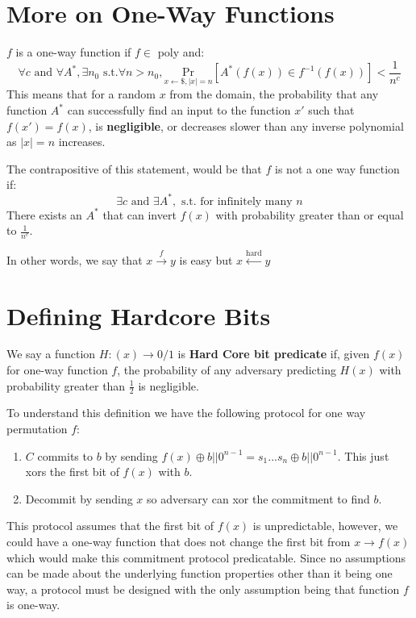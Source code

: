 \documentclass[11pt]{article}
\begin{document}
\section{More on One-Way Functions}
$f$ is a one-way function if $f \in$ poly and:
$$\forall c \text{ and } \forall A^*, \exists n_0 \text{ s.t.} \forall n > n_0, \underset{x \leftarrow \$, |x| = n}{\text{Pr}}[A^*(f(x)) \in f^{-1}(f(x))] < \frac{1}{n^c}$$
This means that for a random $x$ from the domain, the probability that any function $A^{*}$ can successfully find an input to the function $x'$ such that $f(x') = f(x)$, is \textbf{negligible}, or decreases slower than any inverse polynomial as $|x| = n$ increases.
\vspace{1em}

The contrapositive of this statement, would be that $f$ is not a one way function if:
$$\exists c \text{ and } \exists A^*, \text{ s.t. for infinitely many } n$$
There exists an $A^*$ that can invert $f(x)$ with probability greater than or equal to $\frac{1}{n^c}$.
\vspace{1em}

In other words, we say that $x \overset{f}{\rightarrow} y$ is easy but $x \overset{\text{hard}}{\longleftarrow} y$

\section{Defining Hardcore Bits}
We say a function $H: (x) \rightarrow 0/1 $ is \textbf{Hard Core bit predicate} if, given $f(x)$ for one-way function $f$, the probability of any adversary predicting $H(x)$ with probability greater than $\frac{1}{2}$ is negligible.
\vspace{1em}

To understand this definition we have the following protocol for one way permutation $f$:
\begin{enumerate}
    \item $C$ commits to $b$ by sending $f(x) \oplus b || 0^{n-1} = s_1...s_n \oplus b || 0^{n-1}$. This just xors the first bit of $f(x)$ with $b$.
    \item Decommit by sending $x$ so adversary can xor the commitment to find $b$.
\end{enumerate}
This protocol assumes that the first bit of $f(x)$ is unpredictable, however, we could have a one-way function that does not change the first bit from $x \rightarrow f(x)$ which would make this commitment protocol predicatable. Since no assumptions can be made about the underlying function properties other than it being one way, a protocol must be designed with the only assumption being that function $f$ is one-way.
\end{document}
